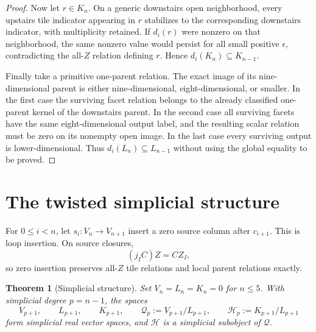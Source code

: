 \documentclass[11pt]{article}
\newtheorem{theorem}{Theorem}[section]
\newcommand{\Qcal}{\mathcal Q}
\newcommand{\Hcal}{\mathcal H}
\newcommand{\1}{\mathbf 1}
\begin{document}
\begin{proof}
Now let $r\in K_n$.  On a generic downstairs open neighborhood, every
upstairs tile indicator appearing in $r$ stabilizes to the corresponding
downstairs indicator, with multiplicity retained.  If $d_i(r)$ were
nonzero on that neighborhood, the same nonzero value would persist for all
small positive $\epsilon$, contradicting the all-$Z$ relation defining
$r$.  Hence $d_i(K_n)\subseteq K_{n-1}$.

Finally take a primitive one-parent relation.  The exact image of its
nine-dimensional parent is either nine-dimensional, eight-dimensional, or
smaller.  In the first case the surviving facet relation belongs to the
already classified one-parent kernel of the downstairs parent.  In the
second case all surviving facets have the same eight-dimensional output
label, and the resulting scalar relation must be zero on its nonempty open
image.  In the last case every surviving output is lower-dimensional.
Thus $d_i(L_n)\subseteq L_{n-1}$ without using the global equality to be
proved.
\end{proof}

\section{The twisted simplicial structure}
\label{sec:simplicial}

For $0\le i<n$, let $s_i:V_n\to V_{n+1}$ insert a zero source column after
$c_{i+1}$.  This is loop insertion.  On source closures,
\begin{equation}\label{eq:zeroinsertion}
(j_I C)Z=CZ_I,
\end{equation}
so zero insertion preserves all-$Z$ tile relations and local parent
relations exactly.

\begin{theorem}[Simplicial structure]\label{thm:simplicial}
Set $V_n=L_n=K_n=0$ for $n\le5$.  With simplicial degree $p=n-1$, the
spaces
\[
V_{p+1},\qquad L_{p+1},\qquad K_{p+1},\qquad
\Qcal_p:=V_{p+1}/L_{p+1},\qquad
\Hcal_p:=K_{p+1}/L_{p+1}
\]
form simplicial real vector spaces, and $\Hcal$ is a simplicial subobject of
$\Qcal$.
\end{theorem}
\end{document}
